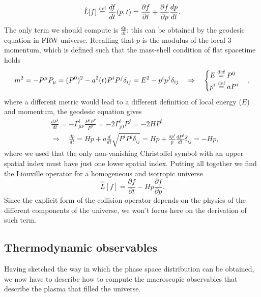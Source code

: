 $$
\hat{L}[f]\stackrel{\text{def}}{=}\frac{df}{dt}(p, t)= \frac{\partial f}{\partial t}+\frac{\partial f}{\partial p}\frac{dp}{dt}.
$$ 
The only term we should compute is $\tfrac{dp}{dt}$: this can be obtained by the geodesic equation in FRW universe. Recalling that $p$ is the modulus of the local 3-momentum, which is defined such that the mass-shell condition of flat spacetime holds
\begin{align*}
    m^2=-P^\mu P_\mu=(P^0)^2-a^2(t)P^iP^j\delta_{ij}=E^2-p^ip^j\delta_{ij}\quad\Rightarrow\quad
    \begin{cases}
        E\stackrel{\text{def}}{=} P^0\\
        p^i\stackrel{\text{def}}{=} a P^i
    \end{cases},
\end{align*}
where a different metric would lead to a different definition of local energy ($E$) and momentum, the geodesic equation gives
\begin{align*}
    &\frac{dP^i}{dt}=-\Gamma^{i}_{\mu\nu}\frac{P^\mu P^\nu}{P^0}=-2\Gamma^{i}_{j0}P^j=-2HP^i\\
    &\Rightarrow\quad \frac{dp}{dt}=H p+a\frac{d}{dt}\sqrt{P^iP^j\delta_{ij}}=Hp+\frac{ap^i}{p}\frac{dP^j}{dt}\delta_{ij}=-Hp,
\end{align*}
where we used that the only non-vanishing Christoffel symbol with an upper spatial index must have just one lower spatial index. Putting all together we find the Liouville operator for a homogeneous and isotropic universe
\begin{equation}
    \label{eq:Homo_Iso_Liouville}
    \hat L[f]=\frac{\partial f}{\partial t}-Hp\frac{\partial f}{\partial p}.
\end{equation}
Since the explicit form of the collision operator depends on the physics of the different components of the universe, we won't focus here on the derivation of such term. 
\subsection{Thermodynamic observables}
Having sketched the way in which the phase space distribution can be obtained, we now have to describe how to compute the macroscopic observables that describe the plasma that filled the universe. 

